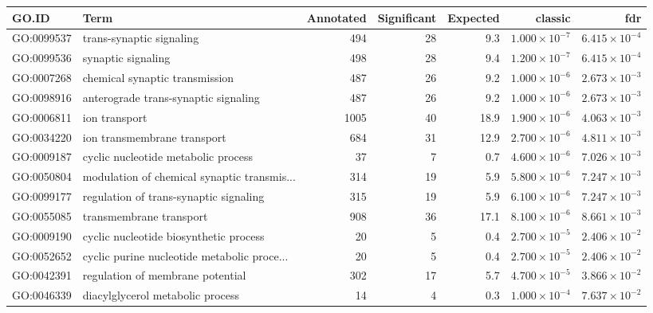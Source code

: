 \begin{table}[ht]
\centering
\begin{adjustbox}{width=\textwidth}
\begin{tabular}{llrrrrr}
  \hline
GO.ID & Term & Annotated & Significant & Expected & classic & fdr \\ 
  \hline
GO:0099537 & trans-synaptic signaling & 494 & 28 & 9.3 & $1.000 \times 10^{-7}$ & $6.415 \times 10^{-4}$ \\ 
  GO:0099536 & synaptic signaling & 498 & 28 & 9.4 & $1.200 \times 10^{-7}$ & $6.415 \times 10^{-4}$ \\ 
  GO:0007268 & chemical synaptic transmission & 487 & 26 & 9.2 & $1.000 \times 10^{-6}$ & $2.673 \times 10^{-3}$ \\ 
  GO:0098916 & anterograde trans-synaptic signaling & 487 & 26 & 9.2 & $1.000 \times 10^{-6}$ & $2.673 \times 10^{-3}$ \\ 
  GO:0006811 & ion transport & 1005 & 40 & 18.9 & $1.900 \times 10^{-6}$ & $4.063 \times 10^{-3}$ \\ 
  GO:0034220 & ion transmembrane transport & 684 & 31 & 12.9 & $2.700 \times 10^{-6}$ & $4.811 \times 10^{-3}$ \\ 
  GO:0009187 & cyclic nucleotide metabolic process & 37 & 7 & 0.7 & $4.600 \times 10^{-6}$ & $7.026 \times 10^{-3}$ \\ 
  GO:0050804 & modulation of chemical synaptic transmis... & 314 & 19 & 5.9 & $5.800 \times 10^{-6}$ & $7.247 \times 10^{-3}$ \\ 
  GO:0099177 & regulation of trans-synaptic signaling & 315 & 19 & 5.9 & $6.100 \times 10^{-6}$ & $7.247 \times 10^{-3}$ \\ 
  GO:0055085 & transmembrane transport & 908 & 36 & 17.1 & $8.100 \times 10^{-6}$ & $8.661 \times 10^{-3}$ \\ 
  GO:0009190 & cyclic nucleotide biosynthetic process & 20 & 5 & 0.4 & $2.700 \times 10^{-5}$ & $2.406 \times 10^{-2}$ \\ 
  GO:0052652 & cyclic purine nucleotide metabolic proce... & 20 & 5 & 0.4 & $2.700 \times 10^{-5}$ & $2.406 \times 10^{-2}$ \\ 
  GO:0042391 & regulation of membrane potential & 302 & 17 & 5.7 & $4.700 \times 10^{-5}$ & $3.866 \times 10^{-2}$ \\ 
  GO:0046339 & diacylglycerol metabolic process & 14 & 4 & 0.3 & $1.000 \times 10^{-4}$ & $7.637 \times 10^{-2}$ \\ 

\end{tabular}
\end{adjustbox}
\end{table}
